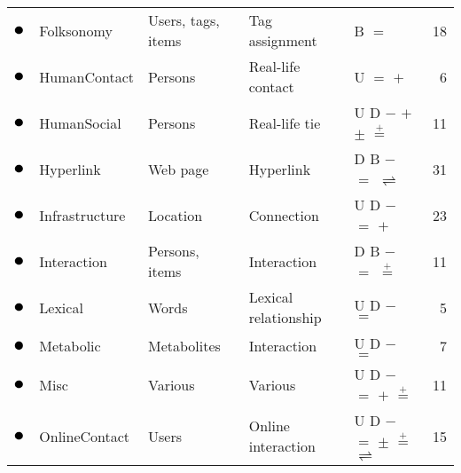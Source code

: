\begin{tabular}{lllllr}
\textcolor{colorFolksonomy}{$\newmoon$} &Folksonomy & Users, tags, items & Tag assignment & \phantom{U} \phantom{D} B \phantom{$-$} $=$ \phantom{$+$} \phantom{$\pm$} \phantom{$\stackrel{+}{=}$} \phantom{$*$} \phantom{$_*{}^*$} \phantom{$\rightleftharpoons$} \phantom{$++$}  &  18\\
\textcolor{colorHumanContact}{$\newmoon$} &HumanContact & Persons & Real-life contact & U \phantom{D} \phantom{B} \phantom{$-$} $=$ $+$ \phantom{$\pm$} \phantom{$\stackrel{+}{=}$} \phantom{$*$} \phantom{$_*{}^*$} \phantom{$\rightleftharpoons$} \phantom{$++$}  &  6\\
\textcolor{colorHumanSocial}{$\newmoon$} &HumanSocial & Persons & Real-life tie & U D \phantom{B} $-$ \phantom{$=$} $+$ $\pm$ $\stackrel{+}{=}$ \phantom{$*$} \phantom{$_*{}^*$} \phantom{$\rightleftharpoons$} \phantom{$++$}  &  11\\
\textcolor{colorHyperlink}{$\newmoon$} &Hyperlink & Web page & Hyperlink & \phantom{U} D B $-$ $=$ \phantom{$+$} \phantom{$\pm$} \phantom{$\stackrel{+}{=}$} \phantom{$*$} \phantom{$_*{}^*$} $\rightleftharpoons$ \phantom{$++$}  &  31\\
\textcolor{colorInfrastructure}{$\newmoon$} &Infrastructure & Location & Connection & U D \phantom{B} $-$ $=$ $+$ \phantom{$\pm$} \phantom{$\stackrel{+}{=}$} \phantom{$*$} \phantom{$_*{}^*$} \phantom{$\rightleftharpoons$} \phantom{$++$}  &  23\\
\textcolor{colorInteraction}{$\newmoon$} &Interaction & Persons, items & Interaction & \phantom{U} D B $-$ $=$ \phantom{$+$} \phantom{$\pm$} $\stackrel{+}{=}$ \phantom{$*$} \phantom{$_*{}^*$} \phantom{$\rightleftharpoons$} \phantom{$++$}  &  11\\
\textcolor{colorLexical}{$\newmoon$} &Lexical & Words & Lexical relationship & U D \phantom{B} $-$ $=$ \phantom{$+$} \phantom{$\pm$} \phantom{$\stackrel{+}{=}$} \phantom{$*$} \phantom{$_*{}^*$} \phantom{$\rightleftharpoons$} \phantom{$++$}  &  5\\
\textcolor{colorMetabolic}{$\newmoon$} &Metabolic & Metabolites & Interaction & U D \phantom{B} $-$ $=$ \phantom{$+$} \phantom{$\pm$} \phantom{$\stackrel{+}{=}$} \phantom{$*$} \phantom{$_*{}^*$} \phantom{$\rightleftharpoons$} \phantom{$++$}  &  7\\
\textcolor{colorMisc}{$\newmoon$} &Misc & Various & Various & U D \phantom{B} $-$ $=$ $+$ \phantom{$\pm$} $\stackrel{+}{=}$ \phantom{$*$} \phantom{$_*{}^*$} \phantom{$\rightleftharpoons$} \phantom{$++$}  &  11\\
\textcolor{colorOnlineContact}{$\newmoon$} &OnlineContact & Users & Online interaction & U D \phantom{B} $-$ $=$ \phantom{$+$} $\pm$ $\stackrel{+}{=}$ \phantom{$*$} \phantom{$_*{}^*$} $\rightleftharpoons$ \phantom{$++$}  &  15\\

\end{tabular}
